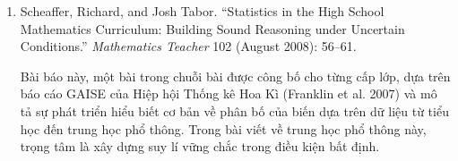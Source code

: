 {{\begin{enumerate}
          \par\noindent\hspace*{1em} Bài báo này, một bài trong chuỗi bài được công bố cho từng cấp lớp, dựa trên báo cáo GAISE của Hiệp hội Thống kê Hoa Kì (Franklin et al. 2007) và mô tả sự phát triển hiểu biết cơ bản về phân bố của biến dựa trên dữ liệu từ tiểu học đến trung học phổ thông. Trong bài viết về trung học cơ sở này, trọng tâm là hiểu trung tâm và độ phân tán. Các tác giả thảo luận một số nhiệm vụ toán học khác nhau được sử dụng trong lớp học, cũng như phản hồi của học sinh.\vspace{1.35\baselineskip}

        \item Scheaffer, Richard, and Josh Tabor. ``Statistics in the High School Mathematics Curriculum: Building Sound Reasoning under Uncertain Conditions.'' \emph{Mathematics Teacher} 102 (August 2008): 56--61.\vspace{.25\baselineskip}

          \par\noindent\hspace*{1em} Bài báo này, một bài trong chuỗi bài được công bố cho từng cấp lớp, dựa trên báo cáo GAISE của Hiệp hội Thống kê Hoa Kì (Franklin et al. 2007) và mô tả sự phát triển hiểu biết cơ bản về phân bố của biến dựa trên dữ liệu từ tiểu học đến trung học phổ thông. Trong bài viết về trung học phổ thông này, trọng tâm là xây dựng suy lí vững chắc trong điều kiện bất định.
      \end{enumerate}}
  }
